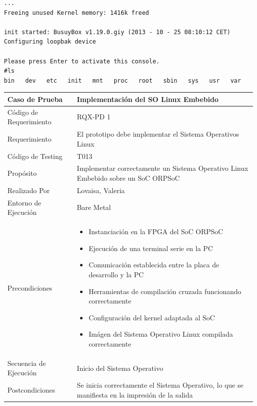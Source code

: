 \begin{lstlisting}[frame=single,caption={Salida de la secuencia de inicio de linux embebido},label={lst:sallinux}]
...
Freeing unused Kernel memory: 1416k freed

init started: BusuyBox v1.19.0.giy (2013 - 10 - 25 08:10:12 CET)
Configuring loopbak device

Please press Enter to activate this console.
#ls
bin	  dev   etc   init   mnt   proc   root   sbin   sys   usr   var
\end{lstlisting}		

\newpage 

		\begin{table}[h!]
		\centering
		\begin{tabular}{ p{5cm} p{10cm}  }
		\hline 
		\rowcolor[gray]{0.8} 	 Caso de Prueba & Implementación del SO Linux Embebido\\
		\hline  		Código de Requerimiento & RQX-PD 1\\ 
		\hline  				  Requerimiento & El prototipo debe implementar el Sistema Operativos Linux\\
		\hline 				  Código de Testing & T013\\ 
		\hline 						  Propósito & Implementar correctamente un Sistema Operativo Linux Embebido sobre un SoC ORPSoC\\
		\hline					  Realizado Por & Lovaisa, Valeria \\
		\hline	 		   Entorno de Ejecución & Bare Metal\\
		\hline		   		   	 Precondiciones & \begin {itemize}
												  \item Instanciación en la FPGA del SoC ORPSoC
												  \item Ejecución de una terminal serie en la PC 
 												  \item Comunicación establecida entre la placa de desarrollo y la PC
 												  \item Herramientas de compilación cruzada funcionando correctamente
 												  \item Configuración del kernel adaptada al SoC
												  \item Imágen del Sistema Operativo Linux compilada correctamente 
												  \end {itemize}\\
		\hline			 Secuencia de Ejecución & Inicio del Sistema Operativo \\
		\hline					Postcondiciones & Se inicia correctamente el Sistema Operativo, lo que se manifiesta en la impresión de la salida

\end{tabular}
\end{table}
